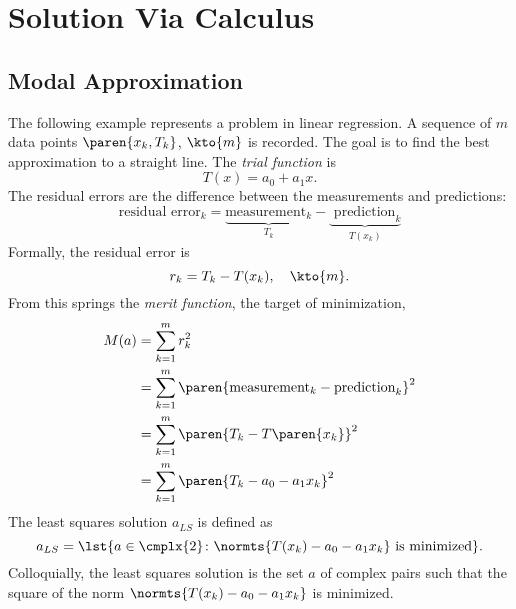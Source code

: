 \chapter{Solution Via Calculus}

\section{Modal Approximation}  %
The following example represents a problem in linear regression. A sequence of $m$ data points $\paren{x_{k}, T_{k}}$,  $\kto{m}$  is recorded. The goal is to find the best approximation to a straight line. The \emph{trial function} is
  \begin{equation*}   %
    T(x) = a_{0} + a_{1} x .
    \label{eq:lr trial}
  \end{equation*}
The residual errors are the difference between the measurements and predictions:\\
  \begin{equation*}   %
      \text{residual error}_{k} = \underbrace{\text{measurement}_{k}}_{T_{k}} - \underbrace{\text{ prediction}_{k}}_{T(x_{k})}
  \end{equation*}
Formally, the residual error is
  \begin{equation*}   %
    r_{k} = T_{k} - T(x_{k}), \quad \kto{m}.
  \end{equation*}
From this springs the \emph{merit function}, the target of minimization,
  \begin{equation}   %
  \begin{split}
    M(a) 
      &= \sum_{k=1}^{m} r_{k}^{2} \\
      &= \sum_{k=1}^{m} \paren{\text{measurement}_{k} - \text{prediction}_{k}}^{2} \\
      &= \sum_{k=1}^{m} \paren{T_{k} - T\paren{x_{k}}}^{2} \\
      &= \sum_{k=1}^{m} \paren{T_{k} - a_{0} - a_{1} x_{k}}^{2}
    \label{eqn:merit}
  \end{split}
  \end{equation}
The least squares solution $a_{LS}$ is defined as 
  \begin{equation*}   %
    a_{LS} = \lst{a \in \cmplx{2} \colon \normts{T(x_{k}) - a_{0} - a_{1} x_{k}} \text{ is minimized} }.
  \end{equation*}
Colloquially, the least squares solution is the set $a$ of complex pairs such that the square of the norm $\normts{T(x_{k}) - a_{0} - a_{1} x_{k}}$ is minimized.

